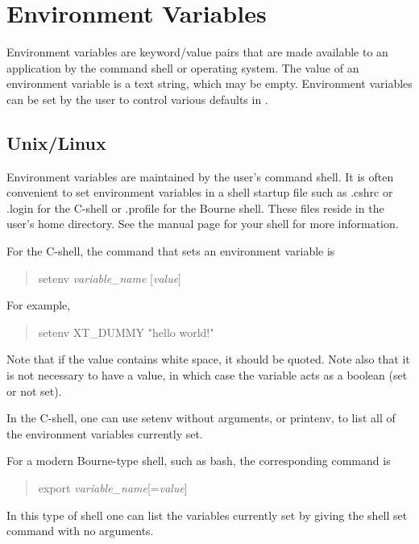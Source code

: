 \section{Environment Variables}


Environment variables are keyword/value pairs that are made available
to an application by the command shell or operating system.  The value
of an environment variable is a text string, which may be empty. 
Environment variables can be set by the user to control various
defaults in {\WRspice}.

\subsection{Unix/Linux}

Environment variables are maintained by the user's command shell.  It
is often convenient to set environment variables in a shell startup
file such as {\vt .cshrc} or {\vt .login} for the C-shell or {\vt
.profile} for the Bourne shell.  These files reside in the user's home
directory.  See the manual page for your shell for more information.

For the C-shell, the command that sets an environment variable is
\begin{quote}
{\vt setenv} {\it variable\_name} [{\it value\/}]
\end{quote}
For example,
\begin{quote}
{\vt setenv XT\_DUMMY "hello world!"}
\end{quote}
Note that if the value contains white space, it should be quoted. 
Note also that it is not necessary to have a value, in which case the
variable acts as a boolean (set or not set).

In the C-shell, one can use {\vt setenv} without arguments, or {\vt
printenv}, to list all of the environment variables currently set.

For a modern Bourne-type shell, such as {\vt bash}, the
corresponding command is
\begin{quote}
{\vt export} {\it variable\_name\/}[={\it value\/}]
\end{quote}
In this type of shell one can list the variables currently set by
giving the shell {\vt set} command with no arguments.

